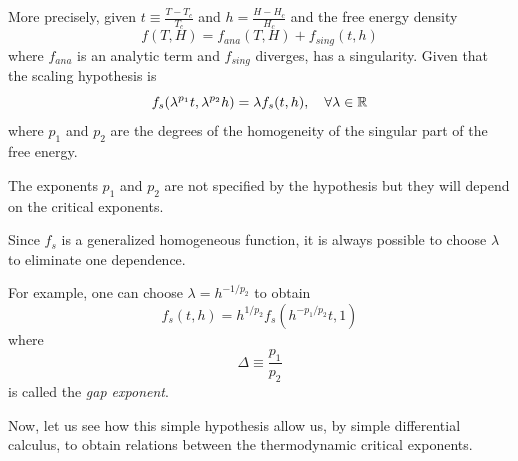 \documentclass[../main/main.tex]{subfiles}
\begin{document}
More precisely, given \( t \equiv  \frac{T - T_c}{T_c}\) and \( h = \frac{H - H_c}{H_c} \) and the free energy density
\begin{equation}
  f (T,H) = f_{ana} (T,H) + f_{sing} (t,h)
\end{equation}
where \( f_{ana} \) is an analytic term and \( f_{sing} \) diverges, has a singularity. Given that the scaling hypothesis is
\begin{equation}
  f_s ( \lambda ^{p_1} t, \lambda ^{p_2} h) = \lambda f_s (t,h), \quad \forall \lambda \in \mathbb{R}
\end{equation}
where \( p_1 \) and \( p_2 \) are the degrees of the homogeneity of the singular part of the free energy.
\begin{remark}
The exponents \( p_1 \) and \( p_2 \)  are not specified by the hypothesis but they will depend on the critical exponents.
\end{remark}
\begin{remark}
Since \( f_s \) is a generalized homogeneous function, it is always possible to choose \( \lambda  \) to eliminate one dependence.

For example, one can choose \(   \lambda = h^{-1/p_2} \) to obtain
\begin{equation}
 f_s (t,h) = h^{1/p_2} f_s (h^{-p_1/p_2} t , 1)
\end{equation}
where
\begin{equation}
  \Delta  \equiv \frac{p_1}{p_2}
\end{equation}
is called the \emph{gap exponent}.
\end{remark}

Now, let us see how this simple hypothesis allow us, by simple differential calculus, to obtain relations between the thermodynamic critical exponents.
\end{document}
